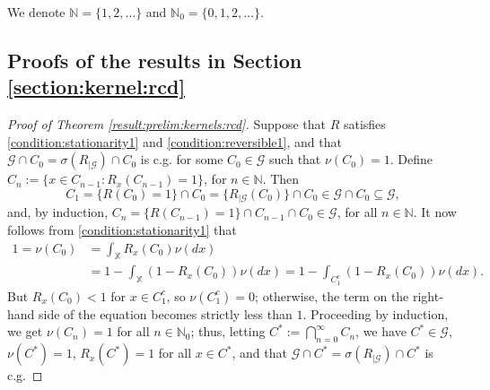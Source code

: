 \documentclass[a4paper]{article}
\theoremstyle{plain}
\theoremstyle{remark}
\theoremstyle{definition}
\begin{document}
We denote $\mathbb{N}=\{1,2,\ldots\}$ and $\mathbb{N}_0=\{0,1,2,\ldots\}$.

\subsection{Proofs of the results in Section \ref{section:kernel:rcd}}

\begin{proof}[Proof of Theorem \ref{result:prelim:kernels:rcd}]
Suppose that $R$ satisfies \eqref{condition:stationarity1} and \eqref{condition:reversible1}, and that $\mathcal{G}\cap C_0=\sigma(R_{|\mathcal{G}})\cap C_0$ is c.g. for some $C_0\in\mathcal{G}$ such that $\nu(C_0)=1$. Define $C_n:=\{x\in C_{n-1}:R_x(C_{n-1})=1\}$, for $n\in\mathbb{N}$. Then
\[C_1=\{R(C_0)=1\}\cap C_0=\{R_{|\mathcal{G}}(C_0)\}\cap C_0\in\mathcal{G}\cap C_0\subseteq\mathcal{G},\]
and, by induction, $C_n=\{R(C_{n-1})=1\}\cap C_{n-1}\cap C_0\in\mathcal{G}$, for all $n\in\mathbb{N}$. It now follows from \eqref{condition:stationarity1} that
\begingroup\allowdisplaybreaks
\begin{align*}
1=\nu(C_0)&=\int_\mathbb{X}R_x(C_0)\nu(dx)\\
&=1-\int_{\mathbb{X}}(1-R_x(C_0))\nu(dx)=1-\int_{C_1^c}(1-R_x(C_0))\nu(dx).
\end{align*}
\endgroup
But $R_x(C_0)<1$ for $x\in C_1^c$, so $\nu(C_1^c)=0$; otherwise, the term on the right-hand side of the equation becomes strictly less than $1$. Proceeding by induction, we get $\nu(C_n)=1$ for all $n\in\mathbb{N}_0$; thus, letting $C^*:=\bigcap_{n=0}^\infty C_n$, we have $C^*\in\mathcal{G}$, $\nu(C^*)=1$, $R_x(C^*)=1$ for all $x\in C^*$, and that $\mathcal{G}\cap C^*=\sigma(R_{|\mathcal{G}})\cap C^*$ is c.g.


\end{proof}
\end{document}
